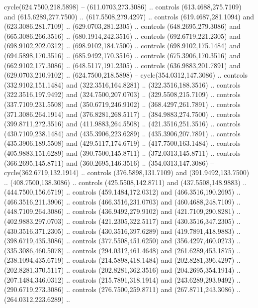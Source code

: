 {{\begin{scope}[x=0.80pt,y=-0.80pt,scale=0.038,xshift=-380pt,yshift=360pt]
        cycle(624.7500,218.5898) -- (611.0703,273.3086) .. controls
        (613.4688,275.7109) and (615.6289,277.7500) .. (617.5508,279.4297) .. controls
        (619.4687,281.1094) and (623.3086,281.7109) .. (629.0703,281.2305) .. controls
        (648.2695,279.3086) and (665.3086,266.3516) .. (680.1914,242.3516) .. controls
        (692.6719,221.2305) and (698.9102,202.0312) .. (698.9102,184.7500) .. controls
        (698.9102,175.1484) and (694.5898,170.3516) .. (685.9492,170.3516) .. controls
        (675.3906,170.3516) and (662.9102,177.3086) .. (648.5117,191.2305) .. controls
        (636.9883,201.7891) and (629.0703,210.9102) .. (624.7500,218.5898) --
        cycle(354.0312,147.3086) .. controls (332.9102,151.1484) and
        (322.3516,164.8281) .. (322.3516,188.3516) .. controls (322.3516,197.9492) and
        (324.7500,207.0703) .. (329.5508,215.7109) .. controls (337.7109,231.5508) and
        (350.6719,246.9102) .. (368.4297,261.7891) .. controls (371.3086,264.1914) and
        (376.8281,268.5117) .. (384.9883,274.7500) .. controls (399.8711,272.3516) and
        (411.9883,264.5508) .. (421.3516,251.3516) .. controls (430.7109,238.1484) and
        (435.3906,223.6289) .. (435.3906,207.7891) .. controls (435.3906,189.5508) and
        (429.5117,174.6719) .. (417.7500,163.1484) .. controls (405.9883,151.6289) and
        (390.7500,145.8711) .. (372.0313,145.8711) .. controls (366.2695,145.8711) and
        (360.2695,146.3516) .. (354.0313,147.3086) -- cycle(362.6719,132.1914) ..
        controls (376.5898,131.7109) and (391.9492,133.7500) .. (408.7500,138.3086) ..
        controls (425.5508,142.8711) and (437.5508,148.9883) .. (444.7500,156.6719) ..
        controls (459.1484,172.0312) and (466.3516,190.2695) .. (466.3516,211.3906) ..
        controls (466.3516,231.0703) and (460.4688,248.7109) .. (448.7109,264.3086) ..
        controls (436.9492,279.9102) and (421.7109,290.8281) .. (402.9883,297.0703) ..
        controls (421.2305,322.5117) and (430.3516,347.2305) .. (430.3516,371.2305) ..
        controls (430.3516,397.6289) and (419.7891,418.9883) .. (398.6719,435.3086) ..
        controls (377.5508,451.6250) and (356.4297,460.0273) .. (335.3086,460.5078) ..
        controls (294.0312,461.4648) and (261.6289,453.1875) .. (238.1094,435.6719) ..
        controls (214.5898,418.1484) and (202.8281,396.4297) .. (202.8281,370.5117) ..
        controls (202.8281,362.3516) and (204.2695,354.1914) .. (207.1484,346.0312) ..
        controls (215.7891,318.1914) and (243.6289,293.9492) .. (290.6719,273.3086) ..
        controls (276.7500,259.8711) and (267.8711,243.3086) .. (264.0312,223.6289) ..

\end{scope}}}
